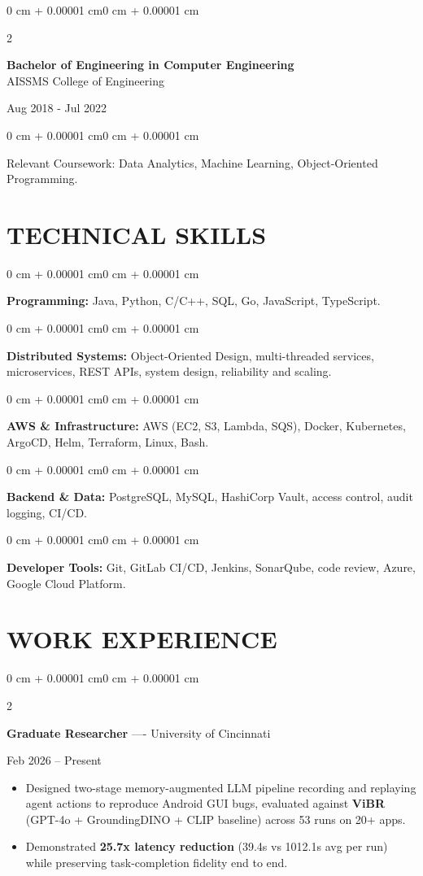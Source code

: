 \documentclass[10pt, letterpaper]{article}
\newenvironment{highlights}{
    \begin{itemize}[
        topsep=0.10 cm,
        parsep=0.06 cm,
        partopsep=0pt,
        itemsep=0.06 cm,
        leftmargin=12pt
    ]
}{
    \end{itemize}
}
\newenvironment{onecolentry}{
    \begin{adjustwidth}{0 cm + 0.00001 cm}{0 cm + 0.00001 cm}
}{
    \end{adjustwidth}
}
\newenvironment{twocolentry}[2][]{
    \onecolentry
    \def\secondColumn{#2}
    \setcolumnwidth{\fill, 4.5 cm}
    \begin{paracol}{2}
}{
    \switchcolumn \raggedleft \secondColumn
    \end{paracol}
    \endonecolentry
}
\begin{document}
\begin{twocolentry}{
    Aug 2018 - Jul 2022
}
    \textbf{Bachelor of Engineering in Computer Engineering} \\
    AISSMS College of Engineering
\end{twocolentry}
\begin{onecolentry}
Relevant Coursework: Data Analytics, Machine Learning, Object-Oriented Programming.
\end{onecolentry}
\section{TECHNICAL SKILLS}
\begin{onecolentry}
\textbf{Programming:} Java, Python, C/C++, SQL, Go, JavaScript, TypeScript.
\end{onecolentry}
\vspace{0.06 cm}
\begin{onecolentry}
\textbf{Distributed Systems:} Object-Oriented Design, multi-threaded services, microservices, REST APIs, system design, reliability and scaling.
\end{onecolentry}
\vspace{0.06 cm}
\begin{onecolentry}
\textbf{AWS \& Infrastructure:} AWS (EC2, S3, Lambda, SQS), Docker, Kubernetes, ArgoCD, Helm, Terraform, Linux, Bash.
\end{onecolentry}
\vspace{0.06 cm}
\begin{onecolentry}
\textbf{Backend \& Data:} PostgreSQL, MySQL, HashiCorp Vault, access control, audit logging, CI/CD.
\end{onecolentry}
\vspace{0.06 cm}
\begin{onecolentry}
\textbf{Developer Tools:} Git, GitLab CI/CD, Jenkins, SonarQube, code review, Azure, Google Cloud Platform.
\end{onecolentry}

\section{WORK EXPERIENCE}
\begin{twocolentry}{Feb 2026 -- Present}
\textbf{Graduate Researcher} ---- University of Cincinnati
\end{twocolentry}
\begin{highlights}
  \item Designed two-stage memory-augmented LLM pipeline recording and replaying agent actions to reproduce Android GUI bugs, evaluated against \textbf{ViBR} (GPT-4o + GroundingDINO + CLIP baseline) across 53 runs on 20+ apps.
  \item Demonstrated \textbf{25.7x latency reduction} (39.4s vs 1012.1s avg per run) while preserving task-completion fidelity end to end.
\end{highlights}
\end{document}
